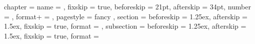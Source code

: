 \ctexset
  {
    chapter    =
      {
        name       = {},   fixskip    = true,
        beforeskip = 21pt, afterskip  = 34pt,
        number     = ,
        format+    = \sffamily\large,
        pagestyle  = fancy
      },
    section    =
      {
        beforeskip = 1.25ex, afterskip = 1.5ex,
        fixskip    = true,   format    = \sffamily\semilarge
      },
    subsection =
      {
        beforeskip = 1.25ex, afterskip = 1.5ex,
        fixskip    = true,   format    = \sffamily
      }
  }

\makeatother \ExplSyntaxOff
\endinput
